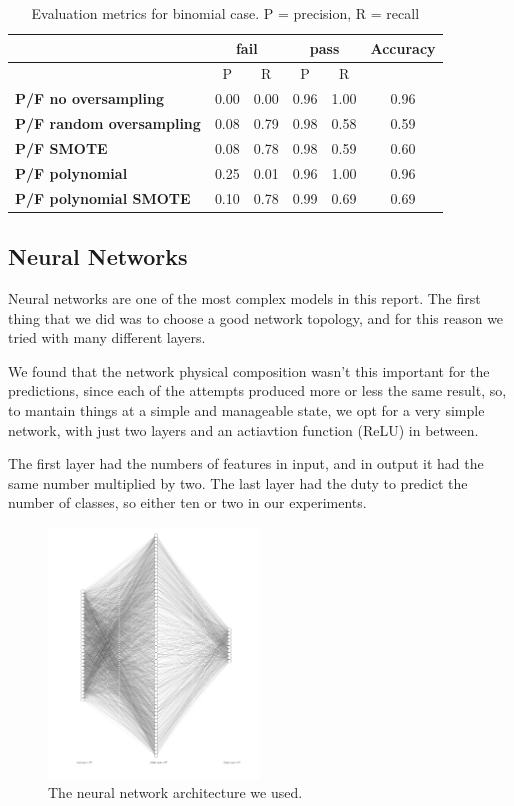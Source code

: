 \documentclass{article}
\begin{document}
\begin{table}[h]
  \centering
  \begin{tabular}{|p{3cm}|c|c|c|c|c|}
    \hline
      & \multicolumn{2}{|c|}{\textbf{fail}} & \multicolumn{2}{|c|}{\textbf{pass}} & \textbf{Accuracy} \\
    \hline
    & P & R & P & R &  \\
    \hline
    \textbf{P/F no oversampling} & 0.00 & 0.00 & 0.96 & 1.00 & 0.96 \\
    \hline
    \textbf{P/F random oversampling} & 0.08 & 0.79 & 0.98 & 0.58 & 0.59 \\
    \hline
    \textbf{P/F SMOTE} & 0.08 & 0.78 & 0.98 & 0.59 & 0.60 \\
    \hline
    \textbf{P/F polynomial} & 0.25 & 0.01 & 0.96 & 1.00 & 0.96 \\
    \hline
    \textbf{P/F polynomial SMOTE} & 0.10 & 0.78 & 0.99 & 0.69 & 0.69 \\
    \hline
  \end{tabular}
  \caption{Evaluation metrics for binomial case. P = precision, R = recall}
  \label{tab:EvMetBinreg}
\end{table}

\FloatBarrier
\subsection{Neural Networks}
\FloatBarrier

Neural networks are one of the most complex models in this report.
The first thing that we did was to choose a good network topology, and for this reason we tried with many different layers.

We found that the network physical composition wasn't this important for the predictions, since each of the attempts produced more or less the same 
result, so, to mantain things at a simple and manageable state, we opt for a very simple network, with just two layers and an actiavtion function 
(ReLU) in between.

The first layer had the numbers of features in input, and in output it had the same number multiplied by two. The last layer had the duty
to predict the number of classes, so either ten or two in our experiments.

\begin{figure}
    \centering
    \includegraphics[width=0.5\textwidth]{nn_architecture.png}
    \caption{\label{fig:nn}The neural network architecture we used.}
\end{figure}
\end{document}
